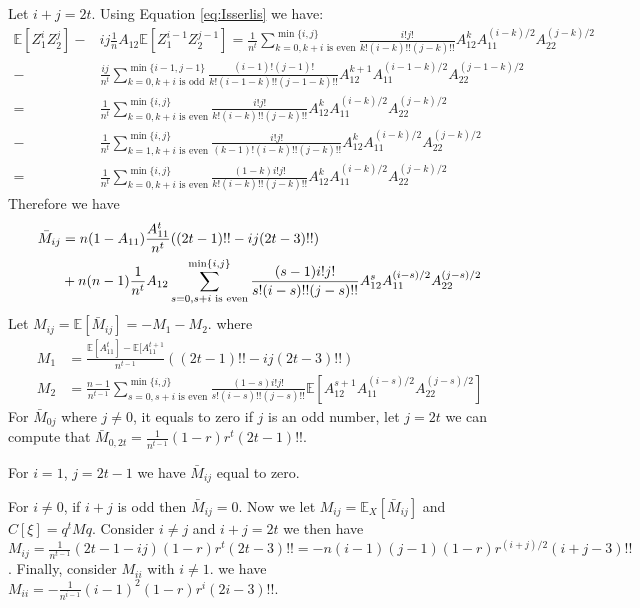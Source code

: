 \documentclass{article}
\def\E{\mathbb{E}}
\begin{document}
Let $i+j=2t$. Using Equation \eqref{eq:Isserlis} we have:
\begin{align*}
\E[Z_1^i Z_2^j]  -  & ij \frac{1}{n}A_{12}\E[Z_1^{i-1}Z_2^{j-1}] =
\frac{1}{n^t} \sum_{k=0, k+i \textrm{ is even}}^{\min\{i,j\}}
\frac{i! j!}{k! (i-k)!!(j-k)!!}
A_{12}^k A_{11}^{(i-k)/2}A_{22}^{(j-k)/2} \\
- & \frac{ij}{n^t} \sum_{k=0, k+i \textrm{ is odd}}^{\min\{i-1,j-1\}}
\frac{(i-1)! (j-1)!}{k! (i-1-k)!!(j-1-k)!!}
A_{12}^{k+1} A_{11}^{(i-1-k)/2}A_{22}^{(j-1-k)/2} \\
= &\frac{1}{n^t} \sum_{k=0, k+i \textrm{ is even}}^{\min\{i,j\}}
\frac{i! j!}{k! (i-k)!!(j-k)!!}
A_{12}^k A_{11}^{(i-k)/2}A_{22}^{(j-k)/2} \\
- & \frac{1}{n^t} \sum_{k=1, k+i \textrm{ is even}}^{\min\{i,j\}}
\frac{i! j!}{(k-1)! (i-k)!!(j-k)!!}
A_{12}^{k} A_{11}^{(i-k)/2}A_{22}^{(j-k)/2} \\
= &\frac{1}{n^t} \sum_{k=0, k+i \textrm{ is even}}^{\min\{i,j\}}
\frac{(1-k)i! j!}{k! (i-k)!!(j-k)!!}A_{12}^k A_{11}^{(i-k)/2}A_{22}^{(j-k)/2} 
\end{align*}
Therefore we have
\begin{align}
\bar{M}_{ij} &= n(1-A_{11})\frac{A^t_{11}}{n^t}  ((2t-1)!!- ij (2t-3)!!)  \notag\\
&+n(n-1)\frac{1}{n^t}A_{12} \sum_{s=0, s+i \textrm{ is even}}^{\min\{i,j\}}
\frac{(s-1)i!j!}{s!(i-s)!!(j-s)!!}
A_{12}^s A_{11}^{(i - s) /2}A_{22}^{(j - s)/2} \label{eq:Mij_second}
\end{align}
Let $M_{ij} = \E[\bar{M}_{ij}] = -M_1 - M_2$.
where
\begin{align}
M_1 & = \frac{\E[A^t_{11}] - \E[A^{t+1}_{11}}{n^{t-1}}  ((2t-1)!!- ij (2t-3)!!)  \\
M_2 & = \frac{n-1}{n^{t-1}} \sum_{s=0, s+i \textrm{ is even}}^{\min\{i,j\}}
\frac{(1-s)i!j!}{s!(i-s)!!(j-s)!!}
\E[A_{12}^{s+1} A_{11}^{(i - s) /2}A_{22}^{(j - s)/2} ]
\end{align}
For $\bar{M}_{0j}$ where $j \neq 0$,
it equals to zero if $j$ is an odd number,
let $j=2t$ we can compute that
$\bar{M}_{0,2t}=\frac{1}{n^{t-1}} (1-r)r^t (2t-1)!! $.

For $i = 1$, $ j = 2 t - 1$ we have
$\bar{M}_{ij}$ equal to zero.

For $i \neq 0$, if $i+j$ is odd then $\bar{M}_{ij} = 0$. Now we let $M_{ij} = \E_X[\bar{M}_{ij}]$ and 
$C[\xi]=q^t M q$.
Consider $i \neq j$ and $i+j = 2t$ we then have
$M_{ij} = \frac{1}{n^{t-1}} (2t-1-ij) (1-r)r^t (2t-3)!! =
-n(i-1)(j-1) (1-r)r^{(i+j)/ 2 } (i+j-3)!!$.
Finally, consider $M_{ii}$ with $i \neq 1$. we have $M_{ii} =
-\frac{1}{n^{i-1}} (i-1)^2 (1-r)r^i (2i-3)!!$.
\end{document}
